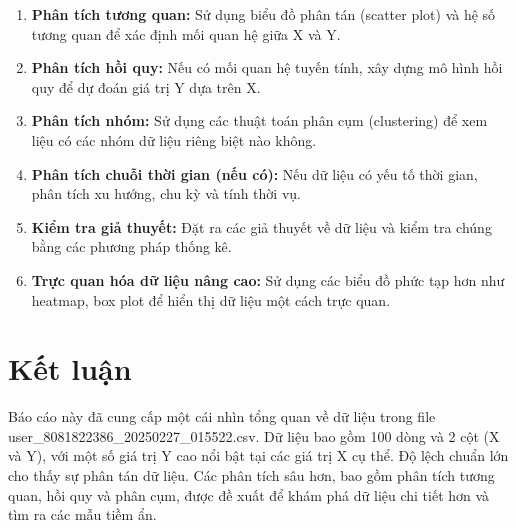 \documentclass[12pt,a4paper]{article}
\begin{document}
\begin{enumerate}
    \item \textbf{Phân tích tương quan:} Sử dụng biểu đồ phân tán (scatter plot) và hệ số tương quan để xác định mối quan hệ giữa X và Y.
    \item \textbf{Phân tích hồi quy:} Nếu có mối quan hệ tuyến tính, xây dựng mô hình hồi quy để dự đoán giá trị Y dựa trên X.
    \item \textbf{Phân tích nhóm:}  Sử dụng các thuật toán phân cụm (clustering) để xem liệu có các nhóm dữ liệu riêng biệt nào không.
    \item \textbf{Phân tích chuỗi thời gian (nếu có):} Nếu dữ liệu có yếu tố thời gian, phân tích xu hướng, chu kỳ và tính thời vụ.
    \item \textbf{Kiểm tra giả thuyết:} Đặt ra các giả thuyết về dữ liệu và kiểm tra chúng bằng các phương pháp thống kê.
    \item \textbf{Trực quan hóa dữ liệu nâng cao:} Sử dụng các biểu đồ phức tạp hơn như heatmap, box plot để hiển thị dữ liệu một cách trực quan.
\end{enumerate}


\section{Kết luận}

Báo cáo này đã cung cấp một cái nhìn tổng quan về dữ liệu trong file user\_8081822386\_20250227\_015522.csv.  Dữ liệu bao gồm 100 dòng và 2 cột (X và Y), với một số giá trị Y cao nổi bật tại các giá trị X cụ thể.  Độ lệch chuẩn lớn cho thấy sự phân tán dữ liệu.  Các phân tích sâu hơn, bao gồm phân tích tương quan, hồi quy và phân cụm, được đề xuất để khám phá dữ liệu chi tiết hơn và tìm ra các mẫu tiềm ẩn.
\end{document}
